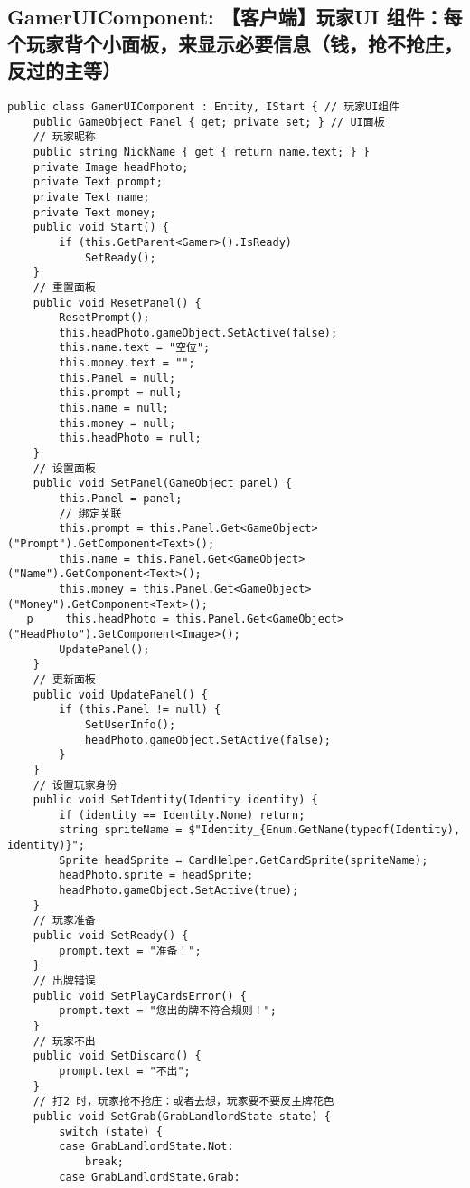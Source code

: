 \documentclass[9pt, b5paper]{article}
\begin{document}
\subsection{GamerUIComponent: 【客户端】玩家UI 组件：每个玩家背个小面板，来显示必要信息（钱，抢不抢庄，反过的主等）}
\label{sec-4-5}
\begin{verbatim}
public class GamerUIComponent : Entity, IStart { // 玩家UI组件
    public GameObject Panel { get; private set; } // UI面板
    // 玩家昵称
    public string NickName { get { return name.text; } }
    private Image headPhoto;
    private Text prompt;
    private Text name;
    private Text money;
    public void Start() {
        if (this.GetParent<Gamer>().IsReady) 
            SetReady();
    }
    // 重置面板
    public void ResetPanel() {
        ResetPrompt();
        this.headPhoto.gameObject.SetActive(false);
        this.name.text = "空位";
        this.money.text = "";
        this.Panel = null;
        this.prompt = null;
        this.name = null;
        this.money = null;
        this.headPhoto = null;
    }
    // 设置面板
    public void SetPanel(GameObject panel) {
        this.Panel = panel;
        // 绑定关联
        this.prompt = this.Panel.Get<GameObject>("Prompt").GetComponent<Text>();
        this.name = this.Panel.Get<GameObject>("Name").GetComponent<Text>();
        this.money = this.Panel.Get<GameObject>("Money").GetComponent<Text>();
   p     this.headPhoto = this.Panel.Get<GameObject>("HeadPhoto").GetComponent<Image>();
        UpdatePanel();
    }
    // 更新面板
    public void UpdatePanel() {
        if (this.Panel != null) {
            SetUserInfo();
            headPhoto.gameObject.SetActive(false);
        }
    }
    // 设置玩家身份
    public void SetIdentity(Identity identity) {
        if (identity == Identity.None) return;
        string spriteName = $"Identity_{Enum.GetName(typeof(Identity), identity)}";
        Sprite headSprite = CardHelper.GetCardSprite(spriteName);
        headPhoto.sprite = headSprite;
        headPhoto.gameObject.SetActive(true);
    }
    // 玩家准备
    public void SetReady() {
        prompt.text = "准备！";
    }
    // 出牌错误
    public void SetPlayCardsError() {
        prompt.text = "您出的牌不符合规则！";
    }
    // 玩家不出
    public void SetDiscard() {
        prompt.text = "不出";
    }
    // 打2 时，玩家抢不抢庄：或者去想，玩家要不要反主牌花色
    public void SetGrab(GrabLandlordState state) {
        switch (state) {
        case GrabLandlordState.Not:
            break;
        case GrabLandlordState.Grab:

\end{verbatim}
\end{document}
